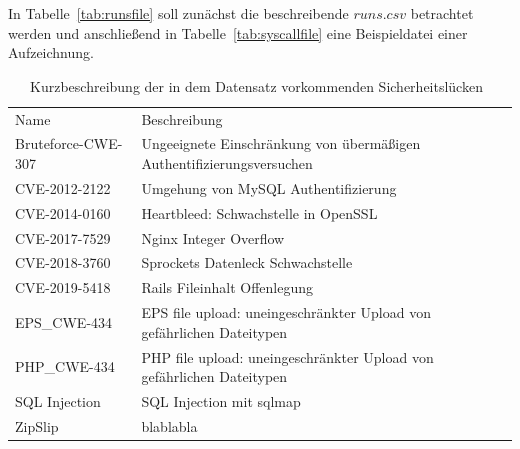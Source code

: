                 In Tabelle~\ref{tab:runsfile} soll zunächst die beschreibende $runs.csv$ betrachtet werden und anschließend in Tabelle~\ref{tab:syscallfile} eine Beispieldatei einer Aufzeichnung.

                \begin{table}[ht]\label{tab:scenarien}
                    \small
                    \centering
                    \begin{tabular}{p{3cm}p{6.5cm}}
                        \rowcolor{Gray!36}
                        \hline
                        \multicolumn{2}{c}{Szenarien}\\
                        \hline
                        Name & Beschreibung \\
                        \rowcolor{Gray!16}
                        \hline
                        \hline
                        Bruteforce-CWE-307 & Ungeeignete Einschränkung von übermäßigen Authentifizierungsversuchen \\
                        \hline
                        CVE-2012-2122 & Umgehung von MySQL Authentifizierung\\
                        \rowcolor{Gray!16}
                        \hline
                        CVE-2014-0160 & Heartbleed: Schwachstelle in OpenSSL\\
                        \hline
                        CVE-2017-7529 & Nginx Integer Overflow \\
                        \rowcolor{Gray!16}
                        \hline
                        CVE-2018-3760 & Sprockets Datenleck Schwachstelle \\
                        \hline
                        CVE-2019-5418 & Rails Fileinhalt Offenlegung \\
                        \rowcolor{Gray!16}
                        \hline
                        EPS\_CWE-434 & EPS file upload: uneingeschränkter Upload von gefährlichen Dateitypen  \\
                        \hline
                        PHP\_CWE-434 & PHP file upload: uneingeschränkter Upload von gefährlichen Dateitypen  \\
                        \rowcolor{Gray!16}
                        \hline
                        SQL Injection & SQL Injection mit sqlmap\\
                        \hline
                        ZipSlip & blablabla \\
                        \hline
                    \end{tabular}
                    \caption{Kurzbeschreibung der in dem Datensatz vorkommenden Sicherheitslücken~\cite{LIDDS}}
                \end{table}


